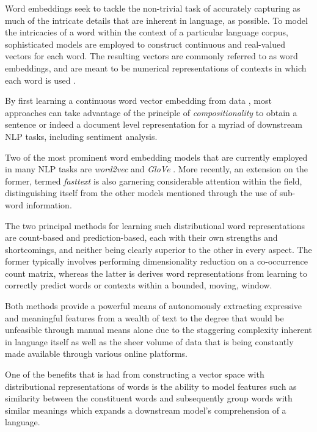 \documentclass[../../fyp.tex]{subfiles}
\begin{document}
Word embeddings seek to tackle the non-trivial task of accurately capturing as much of the intricate details that are inherent in language, as possible. To model the intricacies of a word within the context of a particular language corpus, sophisticated models are employed to construct continuous and real-valued vectors for each word. The resulting vectors are commonly referred to as word embeddings, and are meant to be numerical representations of contexts in which each word is used  \cite{bengio2003} \cite{mikolov2013} \cite{pennington} \cite{tang}.

By first learning a continuous word vector embedding from data \cite{bengio2003} \cite{mikolov2013} \cite{pennington}, most approaches can take advantage of the principle of \textit{compositionality} \cite{frege1892} to obtain a sentence or indeed a document level representation for a myriad of downstream NLP tasks, including sentiment analysis.

Two of the most prominent word embedding models that are currently employed in many NLP tasks are \textit{word2vec} \cite{mikolov2013} and \textit{GloVe} \cite{pennington}. More recently, an extension on the former, termed \textit{fasttext} \cite{bojanowski2017} is also garnering considerable attention within the field, distinguishing itself from the other models mentioned through the use of sub-word information.

The two principal methods for learning such distributional word representations are count-based and prediction-based, each with their own strengths and shortcomings, and neither being clearly superior to the other in every aspect. The former typically involves performing dimensionality reduction on a co-occurrence count matrix, whereas the latter is derives word representations from learning to correctly predict words or contexts within a bounded, moving, window. \cite{pennington}

Both methods provide a powerful means of autonomously extracting expressive and meaningful features from a wealth of text to the degree that would be unfeasible through manual means alone due to the staggering complexity inherent in language itself as well as the sheer volume of data that is being constantly made available through various online platforms.

One of the benefits that is had from constructing a vector space with distributional representations of words is the ability to model features such as similarity between the constituent words and subsequently group words with similar meanings which expands a downstream model's comprehension of a language.
\end{document}
